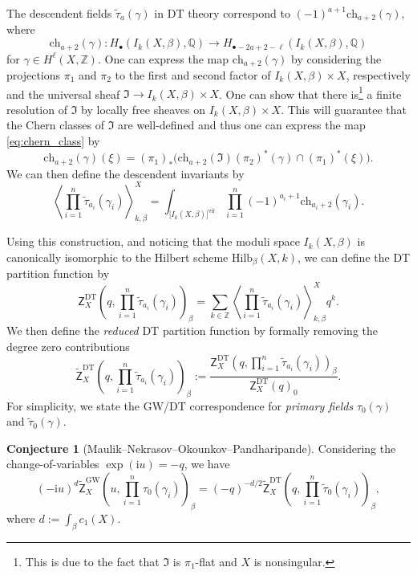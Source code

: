 \documentclass[11pt,colorinlistoftodos]{amsart}
\numberwithin{equation}{subsection}
\theoremstyle{plain}
\theoremstyle{definition}
\newtheorem{Conj}[thm]{Conjecture}
\theoremstyle{remark}
\newcommand{\Z}{\mathbb{Z}}
\newcommand{\Q}{\mathbb{Q}}
\newcommand{\I}{\mathrm{i}}
\begin{document}
The descendent fields $\tilde\tau_a(\gamma)$ in DT theory correspond to $(-1)^{a+1}\mathrm{ch}_{a+2}(\gamma)$, where 
\begin{equation}
\label{eq:chern_class}
\mathrm{ch}_{a+2}(\gamma)\colon H_\bullet(I_k(X,\beta),\Q)\to H_{\bullet-2a+2-\ell}(I_k(X,\beta),\Q)
\end{equation}
for $\gamma\in H^\ell(X,\Z)$. One can express the map $\mathrm{ch}_{a+2}(\gamma)$ by considering the projections $\pi_1$ and $\pi_2$ to the first and second factor of $I_k(X,\beta)\times X$, respectively and the universal sheaf $\mathfrak{I}\to I_k(X,\beta)\times X$. One can show that there is\footnote{This is due to the fact that $\mathfrak{I}$ is $\pi_1$-flat and $X$ is nonsingular.} a finite resolution of $\mathfrak{I}$ by locally free sheaves on $I_k(X,\beta)\times X$. This will guarantee that the Chern classes of $\mathfrak{I}$ are well-defined and thus one can express the map \eqref{eq:chern_class} by 
\[
\mathrm{ch}_{a+2}(\gamma)(\xi)=(\pi_1)_*\big(\mathrm{ch}_{a+2}(\mathfrak{I})(\pi_2)^*(\gamma)\cap(\pi_1)^*(\xi)\big).
\]
We can then define the descendent invariants by 
\begin{equation}
\label{eq:descendent_invariants}
\left\langle\prod_{i=1}^n\tilde\tau_{a_i}(\gamma_i)\right\rangle_{k,\beta}^X=\int_{\big[I_k(X,\beta)\big]^\mathrm{vir}}\prod_{i=1}^n(-1)^{a_i+1}\mathrm{ch}_{a_i+2}(\gamma_i).
\end{equation}

Using this construction, and noticing that the moduli space $I_k(X,\beta)$ is canonically isomorphic to the Hilbert scheme $\mathrm{Hilb}_{\beta}(X,k)$, we can define the DT partition function by 
\[
\mathsf{Z}^\mathrm{DT}_X\left(q,\prod_{i=1}^n \tilde\tau_{a_i}(\gamma_i)\right)_\beta=\sum_{k\in\Z}\left\langle \prod_{i=1}^n\tilde\tau_{a_i}(\gamma_i)\right\rangle_{k,\beta}^Xq^k.
\]
We then define the \emph{reduced} DT partition function by formally removing the degree zero contributions
\[
\widetilde{\mathsf{Z}}^\mathrm{DT}_X\left(q,\prod_{i=1}^n\tilde\tau_{a_i}(\gamma_i)\right)_\beta:=\frac{\mathsf{Z}^\mathrm{DT}_X\left(q,\prod_{i=1}^n \tilde\tau_{a_i}(\gamma_i)\right)_\beta}{\mathsf{Z}^\mathrm{DT}_X(q)_0}.
\]
For simplicity, we state the GW/DT correspondence for \emph{primary fields} $\tau_0(\gamma)$ and $\tilde\tau_0(\gamma)$. 
\begin{Conj}[Maulik--Nekrasov--Okounkov--Pandharipande\cite{MaulikNekreasovOkounkovPandharipande2006_1}]\label{conj:MNOP_1}
Considering the change-of-variables $\exp(\I u)=-q$, we have 
\[
(-\I u)^d\widetilde{\mathsf{Z}}^\mathrm{GW}_X\left(u,\prod_{i=1}^n\tau_0(\gamma_i)\right)_\beta=(-q)^{-d/2}\widetilde{\mathsf{Z}}^\mathrm{DT}_X\left(q,\prod_{i=1}^n\tilde\tau_0(\gamma_i)\right)_\beta,
\]
where $d:=\int_\beta c_1(X)$.
\end{Conj}
\end{document}
